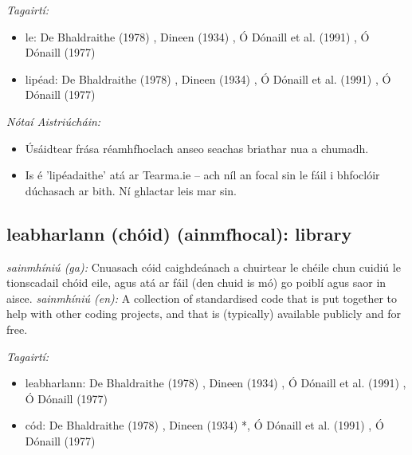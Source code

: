 \documentclass{article}
\begin{document}
 \noindent \textit{Tagairtí:}
\begin{itemize}
	\item le: De Bhaldraithe (1978) \cite{de-bhaldraithe}, Dineen (1934) \cite{dineen}, Ó Dónaill et al. (1991) \cite{focloir-beag}, Ó Dónaill (1977) \cite{odonaill}
	\item lipéad: De Bhaldraithe (1978) \cite{de-bhaldraithe}, Dineen (1934) \cite{dineen}, Ó Dónaill et al. (1991) \cite{focloir-beag}, Ó Dónaill (1977) \cite{odonaill}
\end{itemize}

 \noindent \textit{Nótaí Aistriúcháin:}
\begin{itemize}
	\item Úsáidtear frása réamhfhoclach anseo seachas briathar nua a chumadh.
	\item Is é 'lipéadaithe' atá ar Tearma.ie -- ach níl an focal sin le fáil i bhfoclóir dúchasach ar bith. Ní ghlactar leis mar sin.
\end{itemize}


\subsection*{leabharlann (chóid) (ainmfhocal): library} 
 \noindent \textit{sainmhíniú (ga):} Cnuasach cóid caighdeánach a chuirtear le chéile chun cuidiú le tionscadail chóid eile, agus atá ar fáil (den chuid is mó) go poiblí agus saor in aisce.
\newline\newline
 \noindent \textit{sainmhíniú (en):} A collection of standardised code that is put together to help with other coding projects, and that is (typically) available publicly and for free.
\newline

 \noindent \textit{Tagairtí:}
\begin{itemize}
	\item leabharlann: De Bhaldraithe (1978) \cite{de-bhaldraithe}, Dineen (1934) \cite{dineen}, Ó Dónaill et al. (1991) \cite{focloir-beag}, Ó Dónaill (1977) \cite{odonaill}
	\item cód: De Bhaldraithe (1978) \cite{de-bhaldraithe}, Dineen (1934) \cite{dineen}*, Ó Dónaill et al. (1991) \cite{focloir-beag}, Ó Dónaill (1977) \cite{odonaill}
\end{itemize}
\end{document}
